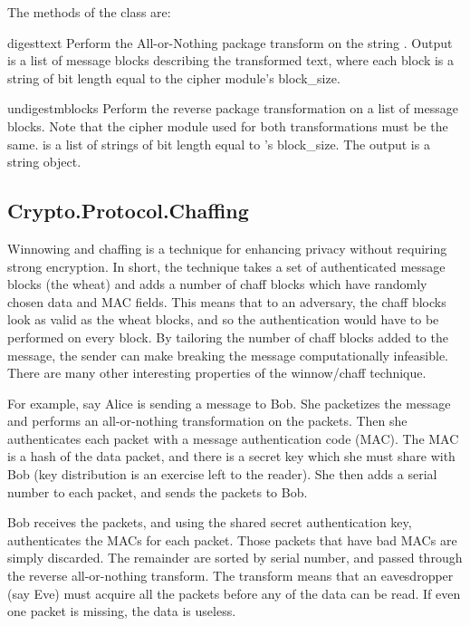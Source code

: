 \documentclass{howto}
\begin{document}
The methods of the  class are:

\begin{methoddesc}{digest}{text}
Perform the All-or-Nothing package transform on the 
string .  Output is a list of message blocks describing the
transformed text, where each block is a string of bit length equal
to the cipher module's block_size.
\end{methoddesc}

\begin{methoddesc}{undigest}{mblocks}
Perform the reverse package transformation on a list of message
blocks.  Note that the cipher module used for both transformations
must be the same.   is a list of strings of bit length
equal to 's block_size.  The output is a string object.
\end{methoddesc}


\subsection{Crypto.Protocol.Chaffing}

Winnowing and chaffing is a technique for enhancing privacy without requiring
strong encryption.  In short, the technique takes a set of authenticated
message blocks (the wheat) and adds a number of chaff blocks which have
randomly chosen data and MAC fields.  This means that to an adversary, the
chaff blocks look as valid as the wheat blocks, and so the authentication
would have to be performed on every block.  By tailoring the number of chaff
blocks added to the message, the sender can make breaking the message
computationally infeasible.  There are many other interesting properties of
the winnow/chaff technique.

For example, say Alice is sending a message to Bob.  She packetizes the
message and performs an all-or-nothing transformation on the packets.  Then
she authenticates each packet with a message authentication code (MAC).  The
MAC is a hash of the data packet, and there is a secret key which she must
share with Bob (key distribution is an exercise left to the reader).  She then
adds a serial number to each packet, and sends the packets to Bob.

Bob receives the packets, and using the shared secret authentication key,
authenticates the MACs for each packet.  Those packets that have bad MACs are
simply discarded.  The remainder are sorted by serial number, and passed
through the reverse all-or-nothing transform.  The transform means that an
eavesdropper (say Eve) must acquire all the packets before any of the data can
be read.  If even one packet is missing, the data is useless.
\end{document}
